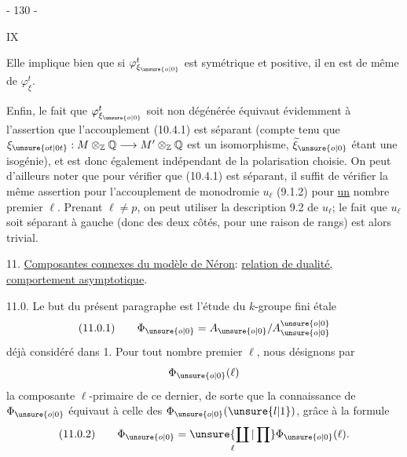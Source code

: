 \begin{center}- 130 -\end{center}
\begin{flushright}IX\end{flushright}

Elle implique bien que si $\varphi^t_{\xi_{\unsure{o|0}}}$ est symétrique et positive, il en est de même de $\varphi^t_\xi$.

Enfin, le fait que $\varphi^t_{\xi_{\unsure{o|0}}}$ soit non dégénérée équivaut évidemment à l'assertion que l'accouplement (10.4.1) est séparant (compte tenu que
$\xi_{\unsure{ot|0t}}:M\otimes_{\mathbb Z}\mathbb Q\longrightarrow M'\otimes_{\mathbb Z}\mathbb Q$
est un isomorphisme, $\widetilde\xi_{\unsure{o|0}}$ étant une isogénie), et est donc également indépendant de la polarisation choisie. On peut d'ailleurs noter que pour vérifier que (10.4.1) est séparant, il suffit de vérifier la même assertion pour l'accouplement de monodromie $u_\ell$ (9.1.2) pour \uline{un} nombre premier $\ell$. Prenant $\ell\ne p$, on peut utiliser la description 9.2 de $u_\ell$; le fait que $u_\ell$ soit séparant à gauche (donc des deux côtés, pour une raison de rangs) est alors trivial.

11. \uline{Composantes connexes du modèle de Néron}: \uline{relation de dualité, comportement asymptotique}.

11.0. Le but du présent paragraphe est l'étude du $k$-groupe fini étale
\[
\text{(11.0.1)}\qquad
\Phi_{\unsure{o|0}}=A_{\unsure{o|0}}/A_{\unsure{o|0}}^{\unsure{o|0}}
\]
déjà considéré dans 1. Pour tout nombre premier $\ell$, nous désignons par
\[
\Phi_{\unsure{o|0}}(\ell)
\]
la composante $\ell$-primaire de ce dernier, de sorte que la connaissance de
$\Phi_{\unsure{o|0}}$ équivaut à celle des
$\Phi_{\unsure{o|0}}(\unsure{l|1})$, grâce à la formule
\[
\text{(11.0.2)}\qquad
\Phi_{\unsure{o|0}}=\underset{\ell}{\unsure{\coprod|\prod}}\Phi_{\unsure{o|0}}(\ell).
\]
